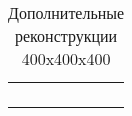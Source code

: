 		\begin{table}[h!]
			\begin{center}
				\begin{tabular}{p{5cm} p{5cm} p{5cm}}
					\toprule
					&
					&
					\\
					&
					&
					\\
					&
					&
					\\
					&
					&
					\\
					\bottomrule
				\end{tabular}
				\caption{Дополнительные реконструкции 400x400x400}
				\label{8-gen-400}
			\end{center}
		\end{table}  